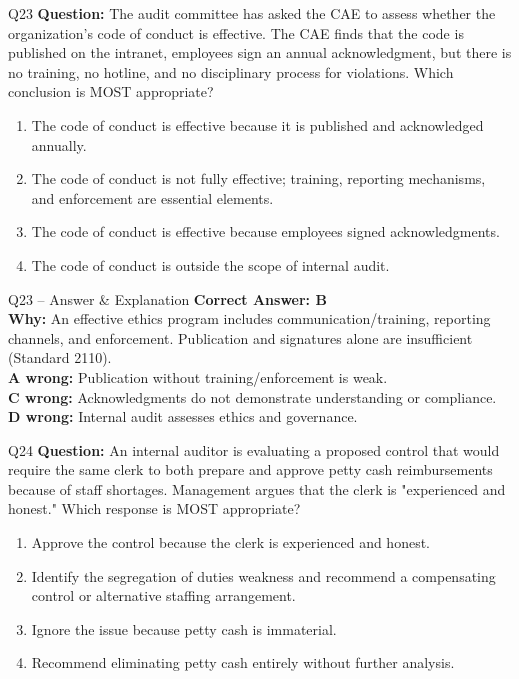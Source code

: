 \documentclass[aspectratio=169,10pt]{beamer}
\begin{document}
	\begin{frame}[t]{Q23}
		\small
		\textbf{Question:} The audit committee has asked the CAE to assess whether the organization's code of conduct is effective. The CAE finds that the code is published on the intranet, employees sign an annual acknowledgment, but there is no training, no hotline, and no disciplinary process for violations. Which conclusion is MOST appropriate?
		\begin{enumerate}[label=\Alph*.,itemsep=1pt,topsep=2pt]
			\item The code of conduct is effective because it is published and acknowledged annually.
			\item The code of conduct is not fully effective; training, reporting mechanisms, and enforcement are essential elements.
			\item The code of conduct is effective because employees signed acknowledgments.
			\item The code of conduct is outside the scope of internal audit.
		\end{enumerate}
	\end{frame}
	
	\begin{frame}[t]{Q23 -- Answer \& Explanation}
		\small
		\textbf{Correct Answer: B} \\[4pt]
		\textbf{Why:} An effective ethics program includes communication/training, reporting channels, and enforcement. Publication and signatures alone are insufficient (Standard 2110). \\[4pt]
		\textbf{A wrong:} Publication without training/enforcement is weak. \\[2pt]
		\textbf{C wrong:} Acknowledgments do not demonstrate understanding or compliance. \\[2pt]
		\textbf{D wrong:} Internal audit assesses ethics and governance.
	\end{frame}
	
	\begin{frame}[t]{Q24}
		\small
		\textbf{Question:} An internal auditor is evaluating a proposed control that would require the same clerk to both prepare and approve petty cash reimbursements because of staff shortages. Management argues that the clerk is "experienced and honest." Which response is MOST appropriate?
		\begin{enumerate}[label=\Alph*.,itemsep=1pt,topsep=2pt]
			\item Approve the control because the clerk is experienced and honest.
			\item Identify the segregation of duties weakness and recommend a compensating control or alternative staffing arrangement.
			\item Ignore the issue because petty cash is immaterial.
			\item Recommend eliminating petty cash entirely without further analysis.
		\end{enumerate}
	\end{frame}
	
\end{document}
